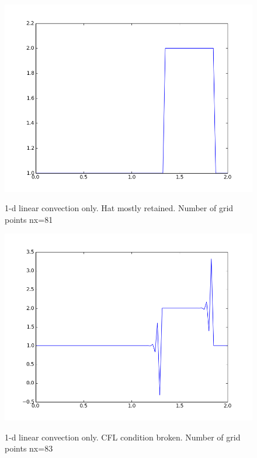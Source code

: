 \documentclass[11pt]{article}
\begin{document}
{	\begin{figure}[num_diff_finest_mesh]
	\centering
	\caption{1-d linear convection only. Hat mostly retained. Number of grid points nx=81}
	\includegraphics[scale=0.8]{keep_hat.png}
	\label{fig:num_diff_finest_mesh}
	\end{figure}

	\begin{figure}[num_diff_too_fine]
	\centering
	\caption{1-d linear convection only. CFL condition broken. Number of grid points nx=83}
	\includegraphics[scale=0.8]{cfl_broke.png}
	\label{fig:num_diff_too_fine}
	\end{figure}



}
\end{document}
